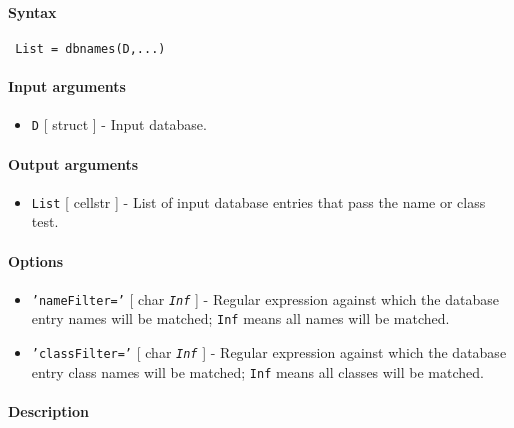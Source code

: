 


	\paragraph{Syntax}
 
 \begin{verbatim}
 List = dbnames(D,...)
 \end{verbatim}
 
 \paragraph{Input arguments}
 
 \begin{itemize}
 \item
   \texttt{D} {[} struct {]} - Input database.
 \end{itemize}
 
 \paragraph{Output arguments}
 
 \begin{itemize}
 \item
   \texttt{List} {[} cellstr {]} - List of input database entries that
   pass the name or class test.
 \end{itemize}
 
 \paragraph{Options}
 
 \begin{itemize}
 \item
   \texttt{'nameFilter='} {[} char \textbar{} \emph{\texttt{Inf}} {]} -
   Regular expression against which the database entry names will be
   matched; \texttt{Inf} means all names will be matched.
 \item
   \texttt{'classFilter='} {[} char \textbar{} \emph{\texttt{Inf}} {]} -
   Regular expression against which the database entry class names will
   be matched; \texttt{Inf} means all classes will be matched.
 \end{itemize}
 
 \paragraph{Description}
 
